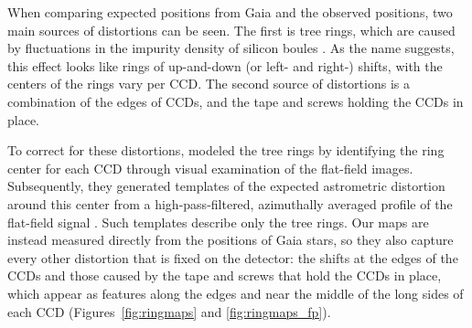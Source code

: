 \documentclass[usenatbib]{mnras}   %
\begin{document}
When comparing expected positions from Gaia and the observed positions, two main sources of distortions can be seen. The first is tree rings, which are caused by fluctuations in the impurity density of silicon boules \citep{Bernstein_2017}. As the name suggests, this effect looks like rings of up-and-down (or left- and right-) shifts, with the centers of the rings vary per CCD. The second source of distortions is a combination of the edges of CCDs, and the tape and screws holding the CCDs in place. 


To correct for these distortions, \cite{Bernstein_2017} modeled the tree rings by identifying the ring center for each CCD through visual examination of the flat-field images. Subsequently, they generated templates of the expected astrometric distortion around this center from a high-pass-filtered, azimuthally averaged profile of the flat-field signal \citep{Bernstein_2017}. Such templates describe only the tree rings. Our maps are instead measured directly from the positions of Gaia stars, so they also capture every other distortion that is fixed on the detector: the shifts at the edges of the CCDs and those caused by the tape and screws that hold the CCDs in place, which appear as features along the edges and near the middle of the long sides of each CCD (Figures~\ref{fig:ringmaps} and \ref{fig:ringmaps_fp}).
\end{document}
